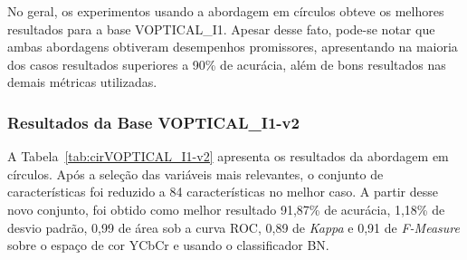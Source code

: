 No geral, os experimentos usando a abordagem em círculos obteve os melhores resultados para a base VOPTICAL\_I1. Apesar desse fato, pode-se notar que ambas abordagens obtiveram desempenhos promissores, apresentando na maioria dos casos resultados superiores a 90\% de acurácia, além de bons resultados nas demais métricas utilizadas.

\subsubsection{Resultados da Base VOPTICAL\_I1-v2}

A Tabela~\ref{tab:cirVOPTICAL_I1-v2} apresenta os resultados da abordagem em círculos. Após a seleção das variáveis mais relevantes, o conjunto de características foi reduzido a 84 características no melhor caso. A partir desse novo conjunto, foi obtido como melhor resultado 91,87\% de acurácia, 1,18\% de desvio padrão, 0,99 de área sob a curva ROC, 0,89 de \textit{Kappa} e 0,91 de \textit{F-Measure} sobre o espaço de cor YCbCr e usando o classificador BN.

